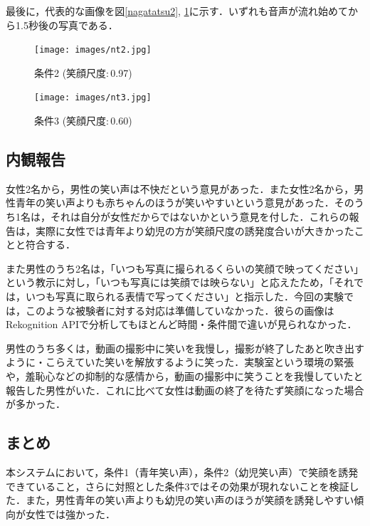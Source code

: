 \documentclass[submit,techreq]{ec2014}
\begin{document}
最後に，代表的な画像を図\ref{nagatatsu2}, \ref{nagatatsu3}に示す．いずれも音声が流れ始めてから1.5秒後の写真である．

\begin{figure}[h!]
\begin{minipage}{0.49\columnwidth}
\begin{center}
\texttt{[image: images/nt2.jpg]}
\end{center}
\caption{条件2 (笑顔尺度$:$0.97)}
\label{nagatatsu2}
\end{minipage}
\begin{minipage}{0.49\columnwidth}
\begin{center}
\texttt{[image: images/nt3.jpg]}
\end{center}
\caption{条件3 (笑顔尺度$:$0.60)}
\label{nagatatsu3}
\end{minipage}
\end{figure}


\subsection{内観報告}

女性2名から，男性の笑い声は不快だという意見があった．また女性2名から，男性青年の笑い声よりも赤ちゃんのほうが笑いやすいという意見があった．そのうち1名は，それは自分が女性だからではないかという意見を付した．これらの報告は，実際に女性では青年より幼児の方が笑顔尺度の誘発度合いが大きかったことと符合する．

また男性のうち2名は，「いつも写真に撮られるくらいの笑顔で映ってください」という教示に対し，「いつも写真には笑顔では映らない」と応えたため，「それでは，いつも写真に取られる表情で写ってください」と指示した．今回の実験では，このような被験者に対する対応は準備していなかった．彼らの画像はRekognition APIで分析してもほとんど時間・条件間で違いが見られなかった．

男性のうち多くは，動画の撮影中に笑いを我慢し，撮影が終了したあと吹き出すように・こらえていた笑いを解放するように笑った．実験室という環境の緊張や，羞恥心などの抑制的な感情から，動画の撮影中に笑うことを我慢していたと報告した男性がいた．これに比べて女性は動画の終了を待たず笑顔になった場合が多かった．

\subsection{まとめ}

本システムにおいて，条件1（青年笑い声），条件2（幼児笑い声）で笑顔を誘発できていること，さらに対照とした条件3ではその効果が現れないことを検証した．また，男性青年の笑い声よりも幼児の笑い声のほうが笑顔を誘発しやすい傾向が女性では強かった．
\end{document}

